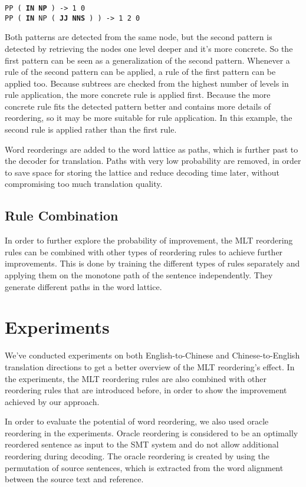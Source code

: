 \documentclass[a4paper]{article}
\begin{document}
\noindent \texttt{PP ( \textbf{IN} \textbf{NP} ) -> 1 0}\\
\texttt{PP ( \textbf{IN} NP ( \textbf{JJ} \textbf{NNS} ) ) -> 1 2 0}\bigskip

Both patterns are detected from the same node, but the second pattern is detected by retrieving the nodes one level deeper and it's more concrete. So the first pattern can be seen as a generalization of the second pattern. Whenever a rule of the second pattern can be applied, a rule of the first pattern can be applied too. Because subtrees are checked from the highest number of levels in rule application, the more concrete rule is applied first. Because the more concrete rule fits the detected pattern better and contains more details of reordering, so it may be more suitable for rule application. In this example, the second rule is applied rather than the first rule.

Word reorderings are added to the word lattice as paths, which is further past to the decoder for translation. Paths with very low probability are removed, in order to save space for storing the lattice and reduce decoding time later, without compromising too much translation quality. 

\subsection{Rule Combination}

In order to further explore the probability of improvement, the MLT reordering rules can be combined with other types of reordering rules to achieve further improvements. This is done by training the different types of rules separately and applying them on the monotone path of the sentence independently. They generate different paths in the word lattice.

\section{Experiments}

We've conducted experiments on both English-to-Chinese and Chinese-to-English translation directions to get a better overview of the MLT reordering's effect. In the experiments, the MLT reordering rules are also combined with other reordering rules that are introduced before, in order to show the improvement achieved by our approach.

In order to evaluate the potential of word reordering, we also used oracle reordering in the experiments. Oracle reordering is considered to be an optimally reordered sentence as input to the SMT system and do not allow additional reordering during decoding.\cite{combine} The oracle reordering is created by using the permutation of source sentences, which is extracted from the word alignment between the source text and reference.\cite{birch2}
\end{document}
